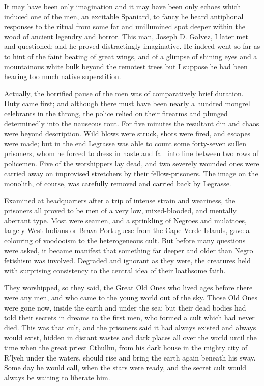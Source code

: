 \begin{pages}
\begin{Leftside}
It may have been only imagination and it may have been only echoes which
induced one of the men, an excitable Spaniard, to fancy he heard
antiphonal responses to the ritual from some far and unillumined spot
deeper within the wood of ancient legendry and horror. This man, Joseph
D. Galvez, I later met and questioned; and he proved distractingly
imaginative. He indeed went so far as to hint of the faint beating of
great wings, and of a glimpse of shining eyes and a mountainous white
bulk beyond the remotest trees but I suppose he had been hearing too
much native superstition.

Actually, the horrified pause of the men was of comparatively brief
duration. Duty came first; and although there must have been nearly a
hundred mongrel celebrants in the throng, the police relied on their
firearms and plunged determinedly into the nauseous rout. For five
minutes the resultant din and chaos were beyond description. Wild blows
were struck, shots were fired, and escapes were made; but in the end
Legrasse was able to count some forty-seven sullen prisoners, whom he
forced to dress in haste and fall into line between two rows of
policemen. Five of the worshippers lay dead, and two severely wounded
ones were carried away on improvised stretchers by their
fellow-prisoners. The image on the monolith, of course, was carefully
removed and carried back by Legrasse.

Examined at headquarters after a trip of intense strain and weariness,
the prisoners all proved to be men of a very low, mixed-blooded, and
mentally aberrant type. Most were seamen, and a sprinkling of Negroes
and mulattoes, largely West Indians or Brava Portuguese from the Cape
Verde Islands, gave a colouring of voodooism to the heterogeneous cult.
But before many questions were asked, it became manifest that something
far deeper and older than Negro fetishism was involved. Degraded and
ignorant as they were, the creatures held with surprising consistency to
the central idea of their loathsome faith.

They worshipped, so they said, the Great Old Ones who lived ages before
there were any men, and who came to the young world out of the sky.
Those Old Ones were gone now, inside the earth and under the sea; but
their dead bodies had told their secrets in dreams to the first men, who
formed a cult which had never died. This was that cult, and the
prisoners said it had always existed and always would exist, hidden in
distant wastes and dark places all over the world until the time when
the great priest Cthulhu, from his dark house in the mighty city of
R'lyeh under the waters, should rise and bring the earth again beneath
his sway. Some day he would call, when the stars were ready, and the
secret cult would always be waiting to liberate him.


\end{Leftside}
\end{pages}
